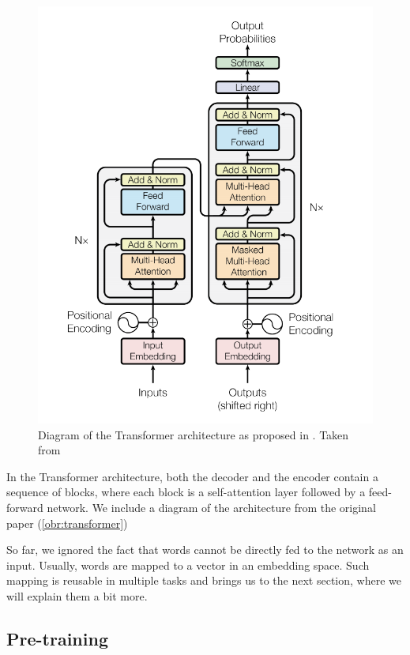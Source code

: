 \begin{figure}[h]\centering
\includegraphics[scale=0.7]{./img/transformer}
\caption{Diagram of the Transformer architecture as proposed in \citep{vaswani2017attention}. Taken from \citep{vaswani2017attention}}
\label{obr:transformer}
\end{figure}


In the Transformer architecture, both the decoder and the encoder contain a sequence of blocks, where each block is a self-attention layer followed by a feed-forward network. We include a diagram of the architecture from the original paper (\autoref{obr:transformer})



So far, we ignored the fact that words cannot be directly fed to the network as an input. Usually, words are mapped to a vector in an embedding space. Such mapping is reusable in multiple tasks and brings us to the next section, where we will explain them a bit more.
 
\subsection{Pre-training}

